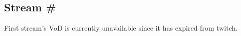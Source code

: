 \subsection{Stream \#\thestreamCounter{}}

First stream's VoD is currently unavailable since it has expired from twitch.